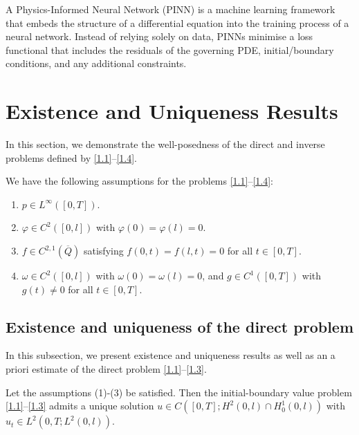 \documentclass[reqno]{amsart}
\begin{document}
\begin{definition}
A Physics-Informed Neural Network (PINN) is a machine learning framework that embeds the structure of a differential equation into the training process of a neural network. Instead of relying solely on data, PINNs minimise a loss functional that includes the residuals of the governing PDE, initial/boundary conditions, and any additional constraints. 
\end{definition}

\section{Existence and Uniqueness Results}\label{3}
In this section, we demonstrate the well-posedness of the direct and inverse problems defined by \eqref{1.1}--\eqref{1.4}. 

We have the following assumptions for the problems \eqref{1.1}--\eqref{1.4}:

\begin{enumerate}
    \item  $p \in L^{\infty}([0,T]) $. 
    \item  $\varphi \in C^2([0,l])$ with $\varphi(0) = \varphi(l) = 0$.
    \item  $f \in C^{2,1}(\overline{Q})$ satisfying $f(0,t) = f(l,t) = 0$ for all $t \in [0,T]$.
    \item  $\omega \in C^2([0,l])$ with $\omega(0) = \omega(l) = 0$, and $g \in C^1([0,T])$ with $g(t) \neq 0$ for all $t \in [0,T]$.
\end{enumerate}

\subsection{Existence and uniqueness of the direct problem}
In this subsection, we present existence and uniqueness results as well as an a priori estimate of the direct problem \eqref{1.1}--\eqref{1.3}. 
\begin{theorem}\label{thm:direct-wellposed}
Let the assumptions (1)-(3) be satisfied. Then the initial-boundary value problem \eqref{1.1}--\eqref{1.3} admits a unique solution $u \in C ([0,T]; H^2(0,l) \cap H_0^1(0,l))$ with $u_t \in L^2(0,T; L^2(0,l))$.
\end{theorem}
\end{document}
